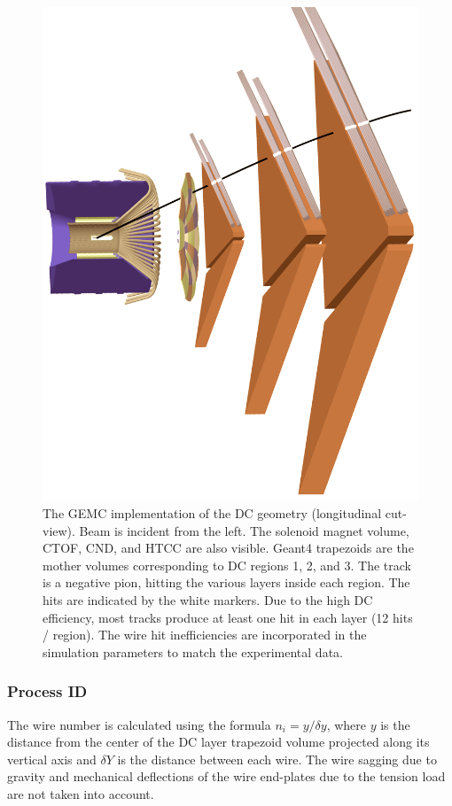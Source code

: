 \begin{figure}[h]
	\centering
	\includegraphics[width=0.99\columnwidth,keepaspectratio]{img/dcGeometry.png}
	\caption{The GEMC implementation of the DC geometry (longitudinal cut-view).
	         Beam is incident from the left. The solenoid magnet volume, CTOF, CND, and HTCC are also visible.
             Geant4 trapezoids are the mother volumes corresponding to DC regions 1, 2, and 3.
             The track is a negative pion, hitting the various layers inside each region.
             The hits are indicated by the white markers. Due to the high DC
             efficiency, most tracks produce at least one hit in each layer (12 hits / region).
             The wire hit inefficiencies are incorporated in the simulation parameters to match the experimental data.}
	\label{fig:dcGeometry}
\end{figure}


\subsubsection{Process ID}
The wire number is calculated using the formula $n_i = y / \delta y$, where $y$ is the
distance from the center of the DC layer trapezoid volume projected along its vertical axis and $\delta Y$
is the distance between each wire.
The wire sagging due to gravity and mechanical deflections of the wire end-plates due to the tension
load are not taken into account.


